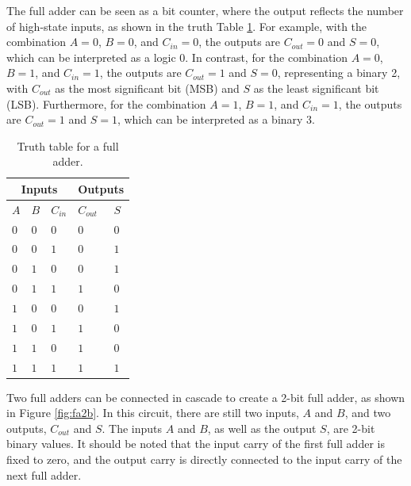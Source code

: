 \documentclass[conference]{IEEEtran}
\begin{document}
	The full adder can be seen as a bit counter, where the output reflects the number of high-state inputs, as shown in the truth Table \ref{tab:full_adder_truth_table}. For example, with the combination \( A=0 \), \( B=0 \), and \( C_{in}=0 \), the outputs are \( C_{out}=0 \) and \( S=0 \), which can be interpreted as a logic 0. In contrast, for the combination \( A=0 \), \( B=1 \), and \( C_{in}=1 \), the outputs are \( C_{out}=1 \) and \( S=0 \), representing a binary 2, with \( C_{out} \) as the most significant bit (MSB) and \( S \) as the least significant bit (LSB). Furthermore, for the combination \( A=1 \), \( B=1 \), and \( C_{in}=1 \), the outputs are \( C_{out}=1 \) and \( S=1 \), which can be interpreted as a binary 3.
	
	\begin{table}[H]
		\centering
		\begin{tabular}{|m{.1cm}|m{0.2cm}|m{0.5cm}|m{0.5cm}|m{0.1cm}|}
			\hline
			\multicolumn{3}{|c|}{Inputs} & \multicolumn{2}{c|}{Outputs} \\
			\hline
			\(A\) & \(B\) & \(C_{in}\) & \(C_{out}\) & \(S\) \\
			\hline
			\(0\) & \centering\(0\) & \centering\(0\) & \centering\(0\) & \(0\) \\
			\(0\) & \centering\(0\) & \centering\(1\) & \centering\(0\) & \(1\) \\
			\(0\) & \centering\(1\) & \centering\(0\) & \centering\(0\) & \(1\) \\
			\(0\) & \centering\(1\) & \centering\(1\) & \centering\(1\) & \(0\) \\
			\(1\) & \centering\(0\) & \centering\(0\) & \centering\(0\) & \(1\) \\
			\(1\) & \centering\(0\) & \centering\(1\) & \centering\(1\) & \(0\) \\
			\(1\) & \centering\(1\) & \centering\(0\) & \centering\(1\) & \(0\) \\
			\(1\) & \centering\(1\) & \centering\(1\) & \centering\(1\) & \(1\) \\
			\hline
		\end{tabular}
		\caption{Truth table for a full adder.}
		\label{tab:full_adder_truth_table}
	\end{table}
	
	
	Two full adders can be connected in cascade to create a 2-bit full adder, as shown in Figure \ref{fig:fa2b}. In this circuit, there are still two inputs, \( A \) and \( B \), and two outputs, \( C_{out} \) and \( S \). The inputs \( A \) and \( B \), as well as the output \( S \), are 2-bit binary values. It should be noted that the input carry of the first full adder is fixed to zero, and the output carry is directly connected to the input carry of the next full adder.
	
\end{document}
